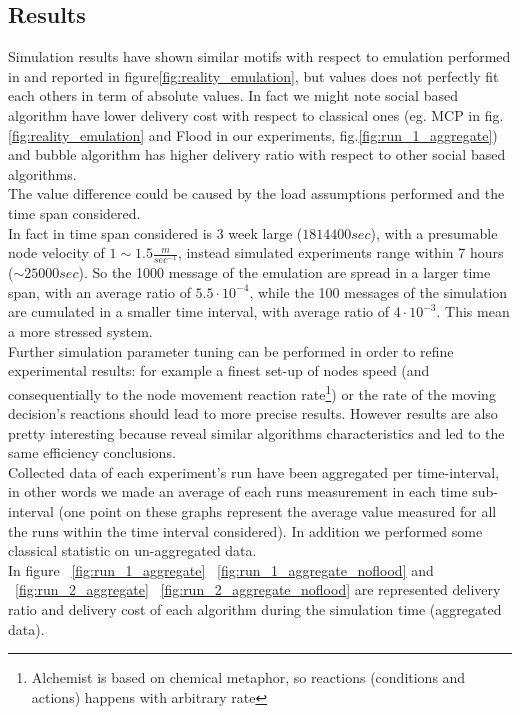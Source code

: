 \newpage
\subsection{Results}
\label{exp_results}

Simulation results have shown similar motifs with respect to emulation performed in\cite{bubble} and reported in figure\ref{fig:reality_emulation}, but values does not perfectly fit each others in term of absolute values. In fact we might note social based algorithm have lower delivery cost with respect to classical ones (eg. MCP in fig.\ref{fig:reality_emulation} and Flood in our experiments, fig.\ref{fig:run_1_aggregate}) and bubble algorithm has higher delivery ratio with respect to other social based algorithms.\\
The value difference could be caused by the load assumptions performed and the time span considered.\\
In fact in\cite{bubble} time span considered is 3 week large ($1814400 sec$), with a presumable node velocity of $1\sim1.5 \frac{m}{sec^{-1}}$, instead simulated experiments range within 7 hours ($\sim 25000 sec$). So the 1000 message of the emulation are spread in a larger time span, with an average ratio of $5.5\cdot 10^{-4}$, while the 100 messages of the simulation are cumulated in a smaller time interval, with average ratio of $4\cdot 10^{-3}$. This mean a more stressed system.\\
Further simulation parameter tuning can be performed in order to refine experimental results: for example a finest set-up of nodes speed (and consequentially to the node movement reaction rate\footnote{Alchemist is based on chemical metaphor, so reactions (conditions and actions) happens with arbitrary rate}) or the rate of the moving decision's reactions should lead to more precise results. However results are also pretty interesting because reveal similar algorithms characteristics and led to the same efficiency conclusions.\\
Collected data of each experiment's run have been aggregated per time-interval, in other words we made an average of each runs measurement in each time sub-interval (one point on these graphs represent the average value measured for all the runs within the time interval considered). In addition we performed some classical statistic on un-aggregated data.\\
In figure ~\ref{fig:run_1_aggregate} ~\ref{fig:run_1_aggregate_noflood} and ~\ref{fig:run_2_aggregate} ~\ref{fig:run_2_aggregate_noflood} are represented delivery ratio and delivery cost of each algorithm during the simulation time (aggregated data).\\

